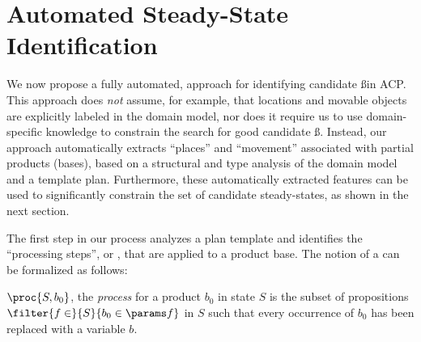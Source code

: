 \section{Automated Steady-State Identification}

We now propose a fully automated, \domind approach for
identifying candidate \ss in ACP.  This approach does {\em
  not} assume, for example, that locations and movable objects are
explicitly labeled in the domain model, nor does it require us to use
domain-specific knowledge to constrain the search for good candidate
\ss.  Instead, our approach automatically extracts
``places'' and ``movement'' %
associated with partial products (bases), based
on a structural and type analysis of the domain model and a template plan.
Furthermore, these automatically extracted features can be used to
significantly constrain the set of candidate steady-states, as shown
in the next section.











The first step in our process analyzes a plan template and
identifies the ``processing steps'', or \psteps , that are applied to a product base.
The notion of a \pstep can be formalized as follows:
\begin{defi}[Process]
$\proc{S,b_0}$, the {\em process} for a product
$b_0$ in state $S$ is the subset of propositions 
$\filter{f\in}{S}{b_0\rel{f}}$ 
in $S$ such that every occurrence of $b_0$ has been replaced with a variable $b$.
\end{defi}

